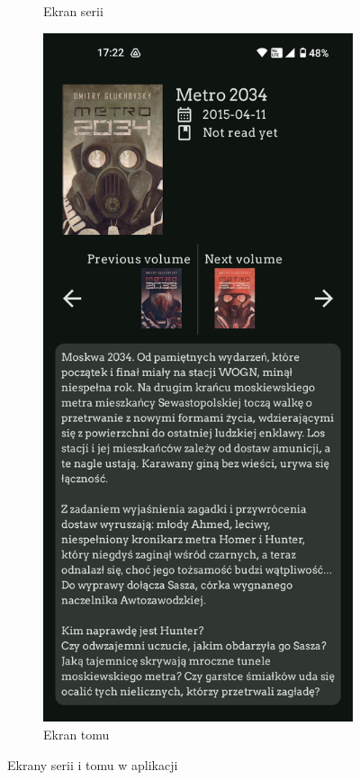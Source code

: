 \documentclass[12pt,twoside]{article}
\begin{document}
\begin{figure}[ht]
\begin{subfigure}[b]{0.48\textwidth}
        \caption{Ekran serii}
    \end{subfigure}
    \hfill
    \begin{subfigure}[b]{0.48\textwidth}
        \includegraphics[width=\textwidth]{figures/volume.png}
        \caption{Ekran tomu}
    \end{subfigure}
    \caption{Ekrany serii i tomu w aplikacji}
    \label{fig:seriesVolume}
\end{figure}
\end{document}
